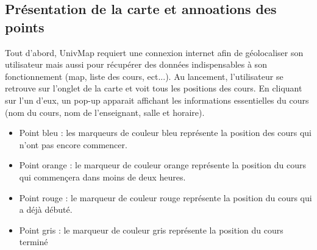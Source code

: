 \documentclass{article}
\begin{document}
\newpage %



\subsection{Présentation de la carte et annoations des points}

Tout d'abord, UnivMap requiert une connexion internet afin de géolocaliser son utilisateur mais aussi
pour récupérer des données indispensables à son fonctionnement (map, liste des cours, ect...). Au lancement,
l'utilisateur se retrouve sur l'onglet de la carte et voit tous les positions des cours. En cliquant sur l'un d'eux,
un pop-up apparait affichant les informations essentielles du cours (nom du cours, nom de l'enseignant, salle et horaire).

\begin{itemize}
    \item Point bleu : les marqueurs de couleur bleu représente la position des cours qui n'ont pas encore commencer.

    \item Point orange : le marqueur de couleur orange représente la position du cours qui commençera dans
    moins de deux heures.

    \item Point rouge : le marqueur de couleur rouge représente la position du cours qui a déjà débuté.

    \item Point gris : le marqueur de couleur gris représente la position du cours terminé
\end{itemize}

\vspace{10pt}   %
\end{document}
